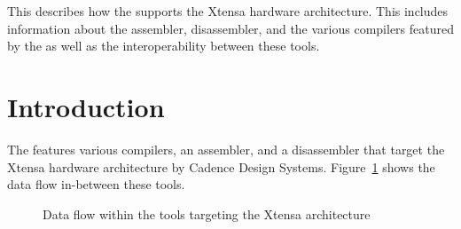 




\renewcommand{\seextensa}{}

{This \documentation{} describes how the \ecs{} supports the Xtensa hardware architecture.
This includes information about the assembler, disassembler, and the various compilers featured by the \ecs{} as well as the interoperability between these tools.}

\section{Introduction}

The \ecs{} features various compilers, an assembler, and a disassembler that target the Xtensa hardware architecture by Cadence Design Systems.
Figure~\ref{fig:xtensadataflow} shows the data flow in-between these tools.

\begin{figure}
\caption{Data flow within the tools targeting the Xtensa architecture}
\label{fig:xtensadataflow}
\end{figure}

